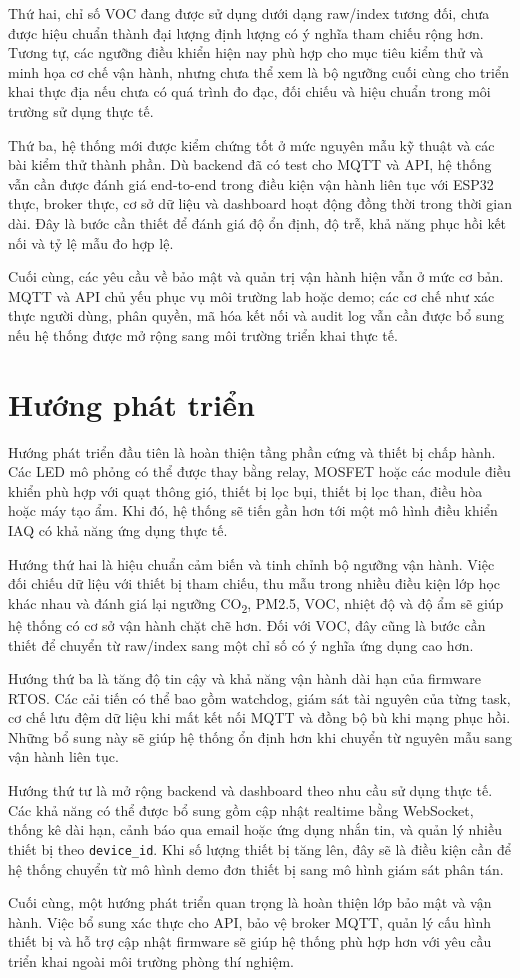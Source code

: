 Thứ hai, chỉ số VOC đang được sử dụng dưới dạng raw/index tương đối, chưa được hiệu
chuẩn thành đại lượng định lượng có ý nghĩa tham chiếu rộng hơn. Tương tự, các ngưỡng
điều khiển hiện nay phù hợp cho mục tiêu kiểm thử và minh họa cơ chế vận hành, nhưng chưa
thể xem là bộ ngưỡng cuối cùng cho triển khai thực địa nếu chưa có quá trình đo đạc, đối
chiếu và hiệu chuẩn trong môi trường sử dụng thực tế.

Thứ ba, hệ thống mới được kiểm chứng tốt ở mức nguyên mẫu kỹ thuật và các bài kiểm thử
thành phần. Dù backend đã có test cho MQTT và API, hệ thống vẫn cần được đánh giá
end-to-end trong điều kiện vận hành liên tục với ESP32 thực, broker thực, cơ sở dữ liệu
và dashboard hoạt động đồng thời trong thời gian dài. Đây là bước cần thiết để đánh giá
độ ổn định, độ trễ, khả năng phục hồi kết nối và tỷ lệ mẫu đo hợp lệ.

Cuối cùng, các yêu cầu về bảo mật và quản trị vận hành hiện vẫn ở mức cơ bản. MQTT và API
chủ yếu phục vụ môi trường lab hoặc demo; các cơ chế như xác thực người dùng, phân quyền,
mã hóa kết nối và audit log vẫn cần được bổ sung nếu hệ thống được mở rộng sang môi
trường triển khai thực tế.

\section{Hướng phát triển}

Hướng phát triển đầu tiên là hoàn thiện tầng phần cứng và thiết bị chấp hành. Các LED mô
phỏng có thể được thay bằng relay, MOSFET hoặc các module điều khiển phù hợp với quạt
thông gió, thiết bị lọc bụi, thiết bị lọc than, điều hòa hoặc máy tạo ẩm. Khi đó, hệ
thống sẽ tiến gần hơn tới một mô hình điều khiển IAQ có khả năng ứng dụng thực tế.

Hướng thứ hai là hiệu chuẩn cảm biến và tinh chỉnh bộ ngưỡng vận hành. Việc đối chiếu
dữ liệu với thiết bị tham chiếu, thu mẫu trong nhiều điều kiện lớp học khác nhau và đánh
giá lại ngưỡng CO\textsubscript{2}, PM2.5, VOC, nhiệt độ và độ ẩm sẽ giúp hệ thống có cơ
sở vận hành chặt chẽ hơn. Đối với VOC, đây cũng là bước cần thiết để chuyển từ raw/index
sang một chỉ số có ý nghĩa ứng dụng cao hơn.

Hướng thứ ba là tăng độ tin cậy và khả năng vận hành dài hạn của firmware RTOS. Các cải
tiến có thể bao gồm watchdog, giám sát tài nguyên của từng task, cơ chế lưu đệm dữ liệu
khi mất kết nối MQTT và đồng bộ bù khi mạng phục hồi. Những bổ sung này sẽ giúp hệ thống
ổn định hơn khi chuyển từ nguyên mẫu sang vận hành liên tục.

Hướng thứ tư là mở rộng backend và dashboard theo nhu cầu sử dụng thực tế. Các khả năng
có thể được bổ sung gồm cập nhật realtime bằng WebSocket, thống kê dài hạn, cảnh báo qua
email hoặc ứng dụng nhắn tin, và quản lý nhiều thiết bị theo \texttt{device\_id}. Khi số
lượng thiết bị tăng lên, đây sẽ là điều kiện cần để hệ thống chuyển từ mô hình demo đơn
thiết bị sang mô hình giám sát phân tán.

Cuối cùng, một hướng phát triển quan trọng là hoàn thiện lớp bảo mật và vận hành. Việc
bổ sung xác thực cho API, bảo vệ broker MQTT, quản lý cấu hình thiết bị và hỗ trợ cập
nhật firmware sẽ giúp hệ thống phù hợp hơn với yêu cầu triển khai ngoài môi trường phòng
thí nghiệm.
